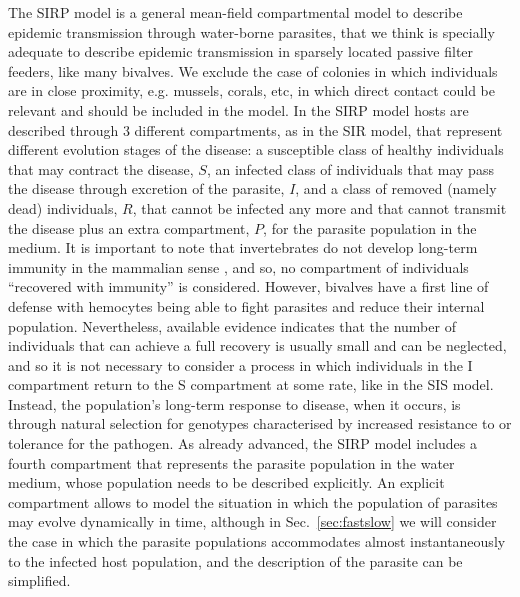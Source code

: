 The SIRP model is a general mean-field compartmental model to describe
epidemic transmission through water-borne parasites, that we think is specially
adequate to describe epidemic transmission in sparsely located passive filter
feeders, like many bivalves.  We exclude the case of colonies in which
individuals are in close proximity, e.g. mussels, corals, etc, in which direct
contact could be relevant and should be included in the model. In the SIRP
model hosts are described through $3$ different compartments, as in the SIR
model, that represent different evolution stages of the disease: a susceptible
class of healthy individuals that may contract the disease, $S$, an infected
class of individuals that may pass the disease through excretion of the
parasite, $I$, and a class of removed (namely dead) individuals, $R$, that
cannot be infected any more and that cannot transmit the disease plus an extra
compartment, $P$, for the parasite population in the medium. It is important to
note that invertebrates do not develop long-term immunity in the mammalian
sense \cite{Powell2015}, and so, no compartment of individuals ``recovered
with immunity'' is considered. However, bivalves have a first line of defense
with hemocytes being able to fight  parasites and reduce their internal
population. Nevertheless, available evidence indicates that the number of
individuals that can achieve a full recovery is usually small and can be
neglected, and so it is not necessary to consider a process in which
individuals in the I compartment return to the S compartment at some rate, like
in the SIS model. Instead, the population’s long-term response to disease, when
it occurs, is through natural selection for genotypes characterised by
increased resistance to or tolerance for the pathogen. As already advanced, the
SIRP model includes a
fourth compartment that represents the parasite population in the water
medium, whose population needs to be described explicitly. An explicit
compartment allows to model the situation in which the population of parasites
may evolve dynamically in time, although in Sec.~\ref{sec:fastslow} we will
consider the case in which the parasite populations accommodates almost
instantaneously to the infected host population, and the description of the
parasite can be simplified.

